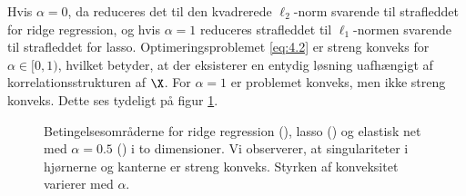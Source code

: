 Hvis $\alpha=0$, da reduceres det til den kvadrerede $\ell_2$-norm svarende til strafleddet for ridge regression, og hvis $\alpha=1$ reduceres strafleddet til $\ell_1$-normen svarende til strafleddet for lasso.
Optimeringsproblemet  \eqref{eq:4.2} er streng konveks for \(\alpha \in [0,1)\), hvilket betyder, at der eksisterer en entydig løsning uafhængigt af korrelationsstrukturen af $\X$.
For  \(\alpha=1\) er problemet konveks, men ikke streng konveks.
Dette ses tydeligt på figur \ref{fig:elastisk}.
%
\begin{figure}[H]
\centering
\scalebox{0.8}{}
\caption[optional short text]{Betingelsesområderne for ridge regression (), lasso () og elastisk net med \(\alpha = 0.5\) () i to dimensioner. Vi observerer, at singulariteter i hjørnerne og kanterne er streng konveks. Styrken af konveksitet varierer med \(\alpha\).} \label{fig:elastisk}
\end{figure}
%
%
%
